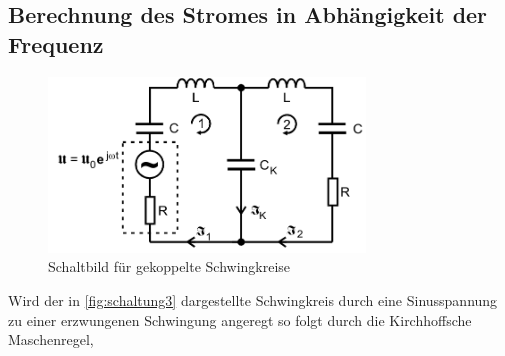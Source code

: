 \subsection{Berechnung des Stromes in Abhängigkeit der Frequenz}


\begin{figure}[H]
    \centering
    \includegraphics[width=0.75\textwidth]{plots/Schaltung3.png}
    \caption{Schaltbild für gekoppelte Schwingkreise \cite{Versuchsanleitung}}
    \label{fig:schaltung3}
\end{figure}

Wird der in \autoref{fig:schaltung3} dargestellte Schwingkreis durch eine Sinusspannung zu einer erzwungenen Schwingung angeregt
so folgt durch die Kirchhoffsche Maschenregel,






